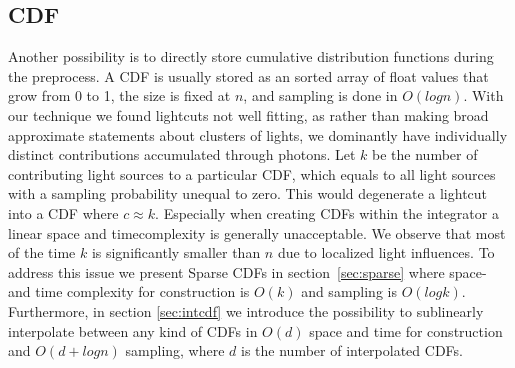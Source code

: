 \subsection{CDF}

Another possibility is to directly store cumulative distribution functions during the preprocess. A CDF is usually stored as an sorted array of float values that grow from 0 to 1, the size is fixed at $n$, and sampling is done in $O(logn)$. With our technique we found lightcuts not well fitting, as rather than making broad approximate statements about clusters of lights, we dominantly have individually distinct contributions accumulated through photons. Let $k$ be the number of contributing light sources to a particular CDF, which equals to all light sources with a sampling probability unequal to zero. This would degenerate a lightcut into a CDF where $c \approx k$. Especially when creating CDFs within the integrator a linear space and timecomplexity is generally unacceptable. We observe that most of the time $k$ is significantly smaller than $n$ due to localized light influences. To address this issue we present Sparse CDFs in section~\ref{sec:sparse} where space- and time complexity for construction is $O(k)$ and sampling is $O(logk)$. Furthermore, in section \ref{sec:intcdf} we introduce the possibility to sublinearly interpolate between any kind of CDFs in $O(d)$ space and time for construction and $O(d + logn)$ sampling, where $d$ is the number of interpolated CDFs.

